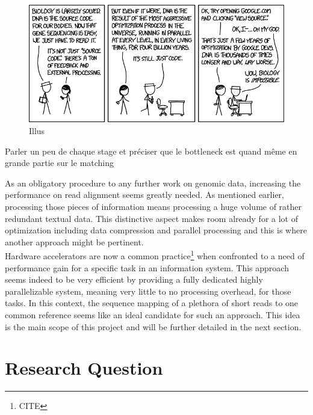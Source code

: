 \begin{minipage}[t]{0.60\textwidth}
\begin{figure}[H]
    \centering
    \includegraphics[scale = 0.2]{Figures/xkcd.png}
    \caption{Illus}
    \label{fig:analysispipe}
\end{figure}
\end{minipage}
\begin{minipage}[t]{0.350\textwidth}
Parler un peu de chaque stage et préciser que le bottleneck est quand même en grande partie sur le matching \\
\end{minipage}
\vspace*{5mm}
As an obligatory procedure to any further work on genomic data, increasing the performance on read alignment seems greatly needed. As mentioned earlier, processing those pieces of information means processing a huge volume of rather redundant textual data. This distinctive aspect makes room already for a lot of optimization including data compression and parallel processing and this is where another approach might be pertinent. \\

Hardware accelerators are now a common practice\footnote{CITE} when confronted to a need of performance gain for a specific task in an information system. This approach seems indeed to be very efficient by providing a fully dedicated highly parallelizable system, meaning very little to no processing overhead, for those tasks. In this context, the sequence mapping of a plethora of short reads to one common reference seems like an ideal candidate for such an approach. This idea is the main scope of this project and will be further detailed in the next section.

\section{Research Question}


